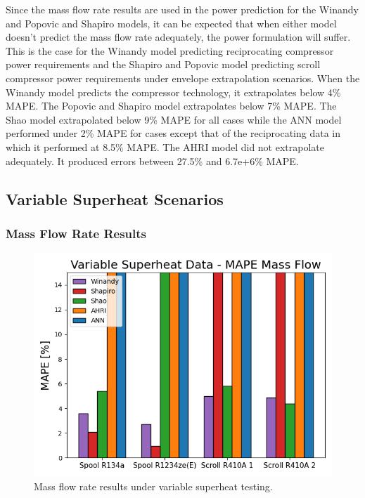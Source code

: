 \documentclass[preprint,11pt,authoryear]{elsarticle}
\begin{document}
Since the mass flow rate results are used in the power prediction for the Winandy and Popovic and Shapiro models, it can be expected that when either model doesn't predict the mass flow rate adequately, the power formulation will suffer. This is the case for the Winandy model predicting reciprocating compressor power requirements and the Shapiro and Popovic model predicting scroll compressor power requirements under envelope extrapolation scenarios. When the Winandy model predicts the compressor technology, it extrapolates below 4\% MAPE. The Popovic and Shapiro model extrapolates below 7\% MAPE. The Shao model extrapolated below 9\% MAPE for all cases while the ANN model performed under 2\% MAPE for cases except that of the reciprocating data in which it performed at 8.5\% MAPE. The AHRI model did not extrapolate adequately. It produced errors between 27.5\% and 6.7e+6\% MAPE. 

\subsection{Variable Superheat Scenarios}
\subsubsection{Mass Flow Rate Results}
\begin{figure}
\centering
\includegraphics[width=0.75\linewidth]{mdot_vspr.png}
\caption{Mass flow rate results under variable superheat testing.}
\label{fig:power_vspd}
\end{figure}
\FloatBarrier
\end{document}
